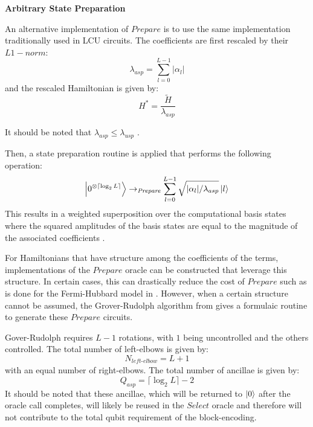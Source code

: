 \textbf{Arbitrary State Preparation}

An alternative implementation of $\textit{Prepare}$ is to use the same implementation traditionally used in LCU circuits.
The coefficients are first rescaled by their $L1-norm$:
\begin{equation}
    \label{asp scale}
    \lambda_{asp} = \sum_{l=0}^{L-1} |\alpha_l|
\end{equation}
and the rescaled Hamiltonian is given by:
\begin{equation}
    H^* = \frac{\tilde{H}}{\lambda_{asp}}
\end{equation}

It should be noted that $\lambda_{asp} \leq \lambda_{usp}$  .

Then, a state preparation routine is applied that performs the following operation:
\begin{equation}
    \ket{0^{\otimes \lceil \log_2{L} \rceil}} \rightarrow_{\textit{Prepare}} \sum_{l = 0}^{L-1} \sqrt{|\alpha_l| / \lambda_{asp}} \ket{l}
\end{equation}
This results in a weighted superposition over the computational basis states where the squared amplitudes of the basis states are equal to the magnitude of the associated coefficients .

For Hamiltonians that have structure among the coefficients of the terms, implementations of the $\textit{Prepare}$ oracle can be constructed that leverage this structure.
In certain cases, this can drastically reduce the cost of $\textit{Prepare}$ such as is done for the Fermi-Hubbard model in \cite{babbush2018encoding}.
However, when a certain structure cannot be assumed, the Grover-Rudolph algorithm from \cite{grover2002creating} gives a formulaic routine to generate these $\textit{Prepare}$ circuits.

Gover-Rudolph requires $L-1$ rotations, with $1$ being uncontrolled and the others controlled.
The total number of left-elbows is given by:
\begin{equation}
    N_{\textit{left-elbow}} = L + 1 
\end{equation}
with an equal number of right-elbows.
The total number of ancillae is given by:
\begin{equation}
    Q_{asp} = \lceil \log_2{L} \rceil - 2
\end{equation}
It should be noted that these ancillae, which will be returned to $\ket{0}$ after the oracle call completes, will likely be reused in the $\textit{Select}$ oracle and therefore will not contribute to the total qubit requirement of the block-encoding.

